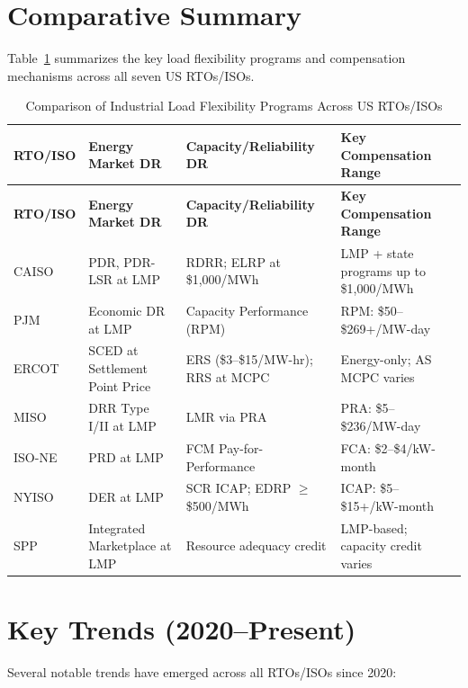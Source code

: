\documentclass[12pt]{article}
\begin{document}
\section{Comparative Summary}

Table~\ref{tab:comparison} summarizes the key load flexibility programs and compensation mechanisms across all seven US RTOs/ISOs.

\begin{longtable}{p{2cm}p{3.5cm}p{3.5cm}p{4cm}}
\caption{Comparison of Industrial Load Flexibility Programs Across US RTOs/ISOs}\label{tab:comparison}\\
\toprule
\textbf{RTO/ISO} & \textbf{Energy Market DR} & \textbf{Capacity/Reliability DR} & \textbf{Key Compensation Range} \\
\midrule
\endfirsthead
\toprule
\textbf{RTO/ISO} & \textbf{Energy Market DR} & \textbf{Capacity/Reliability DR} & \textbf{Key Compensation Range} \\
\midrule
\endhead
CAISO & PDR, PDR-LSR at LMP & RDRR; ELRP at \$1,000/MWh & LMP + state programs up to \$1,000/MWh \\
\midrule
PJM & Economic DR at LMP & Capacity Performance (RPM) & RPM: \$50--\$269+/MW-day \\
\midrule
ERCOT & SCED at Settlement Point Price & ERS (\$3--\$15/MW-hr); RRS at MCPC & Energy-only; AS MCPC varies \\
\midrule
MISO & DRR Type I/II at LMP & LMR via PRA & PRA: \$5--\$236/MW-day \\
\midrule
ISO-NE & PRD at LMP & FCM Pay-for-Performance & FCA: \$2--\$4/kW-month \\
\midrule
NYISO & DER at LMP & SCR ICAP; EDRP $\geq$\$500/MWh & ICAP: \$5--\$15+/kW-month \\
\midrule
SPP & Integrated Marketplace at LMP & Resource adequacy credit & LMP-based; capacity credit varies \\
\bottomrule
\end{longtable}

\section{Key Trends (2020--Present)}

Several notable trends have emerged across all RTOs/ISOs since 2020:
\end{document}
